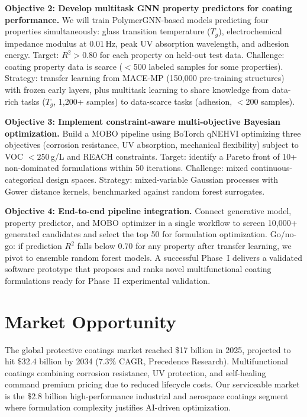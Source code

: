 \documentclass[11pt,letterpaper]{article}
\begin{document}
\textbf{Objective 2: Develop multitask GNN property predictors for coating performance.} We will train PolymerGNN-based models predicting four properties simultaneously: glass transition temperature ($T_g$), electrochemical impedance modulus at 0.01\,Hz, peak UV absorption wavelength, and adhesion energy. Target: $R^2 > 0.80$ for each property on held-out test data. Challenge: coating property data is scarce ($<$500 labeled samples for some properties). Strategy: transfer learning from MACE-MP (150,000 pre-training structures) with frozen early layers, plus multitask learning to share knowledge from data-rich tasks ($T_g$, 1,200+ samples) to data-scarce tasks (adhesion, $<$200 samples).

\textbf{Objective 3: Implement constraint-aware multi-objective Bayesian optimization.} Build a MOBO pipeline using BoTorch qNEHVI optimizing three objectives (corrosion resistance, UV absorption, mechanical flexibility) subject to VOC $< 250$\,g/L and REACH constraints. Target: identify a Pareto front of 10+ non-dominated formulations within 50 iterations. Challenge: mixed continuous-categorical design spaces. Strategy: mixed-variable Gaussian processes with Gower distance kernels, benchmarked against random forest surrogates.

\textbf{Objective 4: End-to-end pipeline integration.} Connect generative model, property predictor, and MOBO optimizer in a single workflow to screen 10,000+ generated candidates and select the top 50 for formulation optimization. Go/no-go: if prediction $R^2$ falls below 0.70 for any property after transfer learning, we pivot to ensemble random forest models. A successful Phase~I delivers a validated software prototype that proposes and ranks novel multifunctional coating formulations ready for Phase~II experimental validation.


\section{Market Opportunity}

The global protective coatings market reached \$17 billion in 2025, projected to hit \$32.4 billion by 2034 (7.3\% CAGR, Precedence Research). Multifunctional coatings combining corrosion resistance, UV protection, and self-healing command premium pricing due to reduced lifecycle costs. Our serviceable market is the \$2.8 billion high-performance industrial and aerospace coatings segment where formulation complexity justifies AI-driven optimization.
\end{document}
